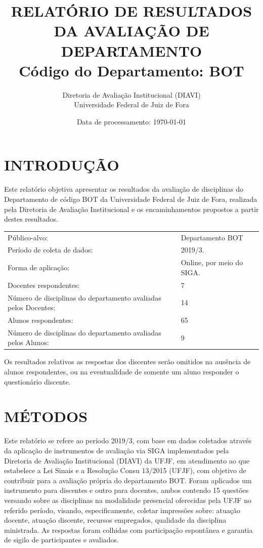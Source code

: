 \documentclass[a4paper,10pt]{article}
\date{Data de processamento: \today}
\begin{document}
\author{Diretoria de Avaliação Institucional (DIAVI) \\ Universidade Federal de Juiz de Fora}

\title{RELATÓRIO DE RESULTADOS DA AVALIAÇÃO DE DEPARTAMENTO\\ Código do Departamento: BOT}
\maketitle
\section{INTRODUÇÃO}
Este relatório objetiva apresentar os resultados da avaliação de disciplinas do Departamento     de código BOT da Universidade Federal de Juiz de Fora, realizada pela     Diretoria de Avaliação Institucional e os encaminhamentos propostos a     partir destes resultados.

\begin{center}
\begin{tabularx}{\linewidth}{X|l}

Público-alvo:& Departamento  BOT\\

Período de coleta de dados:& 2019/3.\\

Forma de aplicação:& Online, por meio do SIGA.\\

Docentes respondentes:& 7\\

Número de disciplinas do departamento avaliadas pelos Docentes:& 14\\

Alunos   respondentes:& 65\\

Número de disciplinas do departamento  avaliadas pelos   Alunos:& 9\\
\end{tabularx}
\end{center}

Os resultados relativos as respostas dos discentes serão omitidos na ausência de alunos respondentes, ou na eventualidade de somente um aluno responder o questionário discente.
\section{MÉTODOS}
Este relatório se refere ao período 2019/3, com base em dados     coletados através da aplicação de instrumentos de avaliação via SIGA     implementados pela Diretoria de Avaliação Institucional (DIAVI) da UFJF, em atendimento     ao que estabelece a Lei Sinais e a Resolução Consu 13/2015 (UFJF),     com objetivo de contribuir para a avaliação própria do departamento BOT.    Foram aplicados um instrumento para discentes e outro para docentes, ambos contendo     15 questões versando sobre as disciplinas na modalidade presencial oferecidas pela UFJF no     referido período, visando, especificamente, coletar impressões sobre: atuação docente, atuação discente,     recursos empregados, qualidade da disciplina ministrada.     As respostas foram colhidas      com participação espontânea e garantia de    sigilo de participantes e avaliados.
\end{document}
